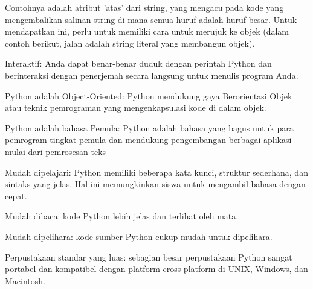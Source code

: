 \noindent 
{\fontsize{14pt}{14pt}\selectfont Contohnya adalah atribut 'atas' dari string, yang mengacu pada kode yang mengembalikan salinan string di mana semua huruf adalah huruf besar. Untuk mendapatkan ini, perlu untuk memiliki cara untuk merujuk ke objek (dalam contoh berikut, jalan adalah string literal yang membangun objek). \\} \par
\vspace{14pt}
\noindent 
{\fontsize{14pt}{14pt}\selectfont Interaktif: Anda dapat benar-benar duduk dengan perintah Python dan berinteraksi dengan penerjemah secara langsung untuk menulis program Anda. \\} \par
\vspace{14pt}
\noindent 
{\fontsize{14pt}{14pt}\selectfont Python adalah Object-Oriented: Python mendukung gaya Berorientasi Objek atau teknik pemrograman yang mengenkapsulasi kode di dalam objek. \\} \par
\vspace{14pt}
\noindent 
{\fontsize{14pt}{14pt}\selectfont Python adalah bahasa Pemula: Python adalah bahasa yang bagus untuk para pemrogram tingkat pemula dan mendukung pengembangan berbagai aplikasi mulai dari pemrosesan teks \\} \par
\vspace{14pt}
\noindent 
{\fontsize{14pt}{14pt}\selectfont Mudah dipelajari: Python memiliki beberapa kata kunci, struktur sederhana, dan sintaks yang jelas. Hal ini memungkinkan siswa untuk mengambil bahasa dengan cepat. \\} \par
\vspace{14pt}
\noindent 
{\fontsize{14pt}{14pt}\selectfont Mudah dibaca: kode Python lebih jelas dan terlihat oleh mata. \\} \par
\vspace{14pt}
\noindent 
{\fontsize{14pt}{14pt}\selectfont Mudah dipelihara: kode sumber Python cukup mudah untuk dipelihara. \\} \par
\vspace{14pt}
\noindent 
{\fontsize{14pt}{14pt}\selectfont Perpustakaan standar yang luas: sebagian besar perpustakaan Python sangat portabel dan kompatibel dengan platform cross-platform di UNIX, Windows, dan Macintosh. \\} \par
